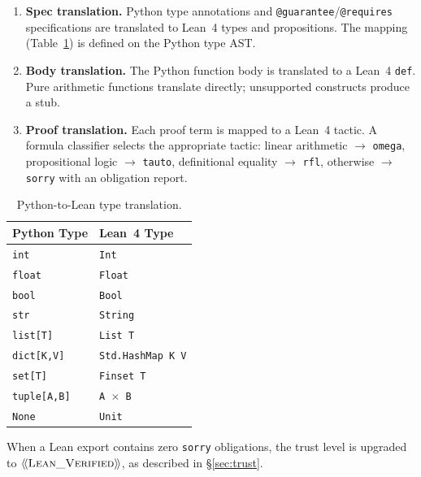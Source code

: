 \documentclass[acmsmall,nonacm,screen]{acmart}
\newcommand{\trustlevel}[1]{\ensuremath{\langle\!\langle \text{#1} \rangle\!\rangle}}
\begin{document}
\begin{enumerate}
\item \textbf{Spec translation.}  Python type annotations and
  \texttt{@guarantee}/\texttt{@requires} specifications are translated
  to Lean~4 types and propositions.  The mapping
  (Table~\ref{tab:types}) is defined on the Python type AST.

\item \textbf{Body translation.}  The Python function body is
  translated to a Lean~4 \texttt{def}.  Pure arithmetic functions
  translate directly; unsupported constructs produce a stub.

\item \textbf{Proof translation.}  Each proof term is mapped to a
  Lean~4 tactic.  A formula classifier selects the appropriate tactic:
  linear arithmetic $\to$ \texttt{omega}, propositional logic $\to$
  \texttt{tauto}, definitional equality $\to$ \texttt{rfl}, otherwise
  $\to$ \texttt{sorry} with an obligation report.
\end{enumerate}

\begin{table}[t]
\caption{Python-to-Lean type translation.}
\label{tab:types}
\centering\small
\begin{tabular}{@{}ll@{}}
\toprule
Python Type & Lean~4 Type \\
\midrule
\texttt{int} & \texttt{Int} \\
\texttt{float} & \texttt{Float} \\
\texttt{bool} & \texttt{Bool} \\
\texttt{str} & \texttt{String} \\
\texttt{list[T]} & \texttt{List T} \\
\texttt{dict[K,V]} & \texttt{Std.HashMap K V} \\
\texttt{set[T]} & \texttt{Finset T} \\
\texttt{tuple[A,B]} & \texttt{A $\times$ B} \\
\texttt{None} & \texttt{Unit} \\
\bottomrule
\end{tabular}
\end{table}

When a Lean export contains zero \texttt{sorry} obligations, the
trust level is upgraded to \trustlevel{\textsc{Lean\_Verified}},
as described in \S\ref{sec:trust}.


\end{document}
